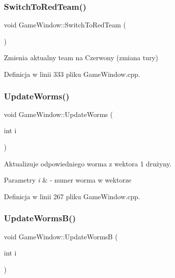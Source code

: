 \subsubsection{\texorpdfstring{Switch\+To\+Red\+Team()}{SwitchToRedTeam()}}
{\footnotesize\ttfamily void Game\+Window\+::\+Switch\+To\+Red\+Team (\begin{DoxyParamCaption}{ }\end{DoxyParamCaption})}



Zmienia aktualny team na Czerwony (zmiana tury) 



Definicja w linii 333 pliku Game\+Window.\+cpp.

\mbox{\label{class_game_window_a043804fa483c8ea2f348b6fb1dac4e4a}} 
\subsubsection{\texorpdfstring{Update\+Worms()}{UpdateWorms()}}
{\footnotesize\ttfamily void Game\+Window\+::\+Update\+Worms (\begin{DoxyParamCaption}\item[{int}]{i }\end{DoxyParamCaption})}



Aktualizuje odpowiedniego worma z wektora 1 drużyny. 


\begin{DoxyParams}{Parametry}
{\em i} & -\/ numer worma w wektorze \\
\hline
\end{DoxyParams}


Definicja w linii 267 pliku Game\+Window.\+cpp.

\mbox{\label{class_game_window_aa6659ccbd2a5d27141eb3f00fdc72ea6}} 
\subsubsection{\texorpdfstring{Update\+Worms\+B()}{UpdateWormsB()}}
{\footnotesize\ttfamily void Game\+Window\+::\+Update\+WormsB (\begin{DoxyParamCaption}\item[{int}]{i }\end{DoxyParamCaption})}



